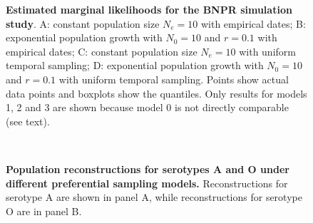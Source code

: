 \documentclass[a4paper,10pt]{article}
\begin{document}
\begin{center}
\begin{figure}[H]
\begin{center}
\end{center}
\caption{\textbf{Estimated marginal likelihoods for the BNPR simulation study}.
A: constant population size $N_e = 10$ with empirical dates; B: exponential population growth with $N_0 = 10$ and $r = 0.1$ with empirical dates; C: constant population size $N_e = 10$ with uniform temporal sampling; D: exponential population growth with $N_0 = 10$ and $r = 0.1$ with uniform temporal sampling.
Points show actual data points and boxplots show the quantiles.
Only results for models 1, 2 and 3 are shown because model 0 is not directly comparable (see text).
}
\label{sfig:BNPR_simu_marglikes}
\end{figure}
\end{center}
\newpage
\begin{center}
\begin{figure}[H]
\begin{center}
 \\
\end{center}
\caption{
\textbf{Population reconstructions for serotypes A and O under different preferential sampling models.}
Reconstructions for serotype A are shown in panel A, while reconstructions for serotype O are in panel B.
}
\label{sfig:full_reconstructions_BNPR}
\end{figure}
\end{center}
\end{document}
